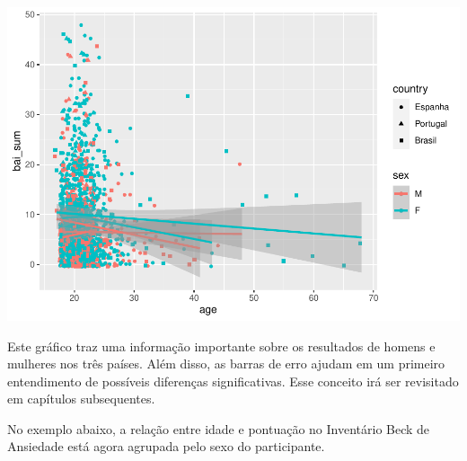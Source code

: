 \documentclass[
]{book}
\newenvironment{Shaded}{\begin{snugshade}}{\end{snugshade}}
\newcommand{\DataTypeTok}[1]{\textcolor[rgb]{0.13,0.29,0.53}{#1}}
\newcommand{\KeywordTok}[1]{\textcolor[rgb]{0.13,0.29,0.53}{\textbf{#1}}}
\newcommand{\NormalTok}[1]{#1}
\newcommand{\OperatorTok}[1]{\textcolor[rgb]{0.81,0.36,0.00}{\textbf{#1}}}
\newcommand{\StringTok}[1]{\textcolor[rgb]{0.31,0.60,0.02}{#1}}
\begin{document}
\begin{center}\includegraphics{gitbook-demo_files/figure-latex/unnamed-chunk-27-1} \end{center}

Este gráfico traz uma informação importante sobre os resultados de homens e mulheres nos três países. Além disso, as barras de erro ajudam em um primeiro entendimento de possíveis diferenças significativas. Esse conceito irá ser revisitado em capítulos subsequentes.

No exemplo abaixo, a relação entre idade e pontuação no Inventário Beck de Ansiedade está agora agrupada pelo sexo do participante.

\begin{Shaded}
\end{Shaded}
\end{document}
